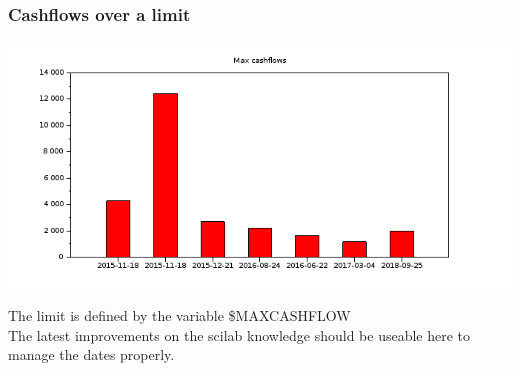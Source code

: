 \documentclass[8pt]{article} %
\begin{document}
%

%

%

%

\subsubsection{Cashflows over a limit}
\includegraphics[scale=0.6]{../Maths/Vector.png}


The limit is defined by the variable \$MAXCASHFLOW\\
The latest improvements on the scilab knowledge should be useable here to manage the dates properly.\\

\end{document}
